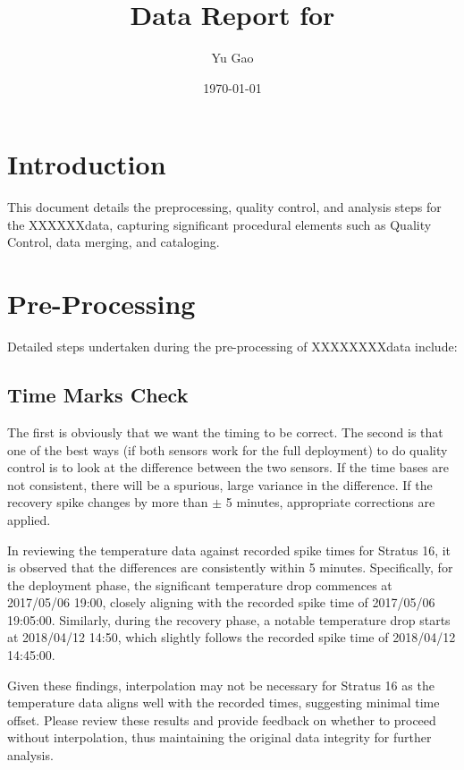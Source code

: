 \documentclass[11pt]{article}
\title{Data Report for \projectname}
\author{Yu Gao}
\date{\today}
\newcommand{\projectname}{XXXXXX}  %
\newcommand{\caseNumber}{XX}
\newcommand{\DeploymentSpike}{2017/05/06 19:00}
\newcommand{\DeploymentRecordedSpike}{2017/05/06 19:05:00}
\newcommand{\RecoverySpike}{2018/04/12 14:50}
\newcommand{\RecoveryRecordedSpike}{2018/04/12 14:45:00}
\begin{document}
\maketitle
\tableofcontents
\newpage

\section{Introduction}
This document details the preprocessing, quality control, and analysis steps for the \projectname data, 
capturing significant procedural elements such as Quality Control, data merging, and cataloging.

\section{Pre-Processing}
Detailed steps undertaken during the pre-processing of \projectname\caseNumber data include:


\subsection{Time Marks Check}
The first is obviously that we want the timing to be correct. 
The second is that one of the best ways (if both sensors work for the full deployment) to do quality control is to look at the difference between the two sensors. 
If the time bases are not consistent, there will be a spurious, large variance in the difference.
If the recovery spike changes by more than $\pm$ 5 minutes, appropriate corrections are applied.

In reviewing the temperature data against recorded spike times for Stratus 16, it is observed
that the differences are consistently within 5 minutes. Specifically, for the deployment phase,
the significant temperature drop commences at \DeploymentSpike, closely aligning with
the recorded spike time of \DeploymentRecordedSpike. 
Similarly, during the recovery phase, a notable temperature drop starts at \RecoverySpike, 
which slightly follows the recorded spike time of \RecoveryRecordedSpike.

Given these findings, interpolation may not be necessary for Stratus 16 as the temperature data 
aligns well with the recorded times, suggesting minimal time offset. Please review these results 
and provide feedback on whether to proceed without interpolation, thus maintaining the original 
data integrity for further analysis.
\end{document}
